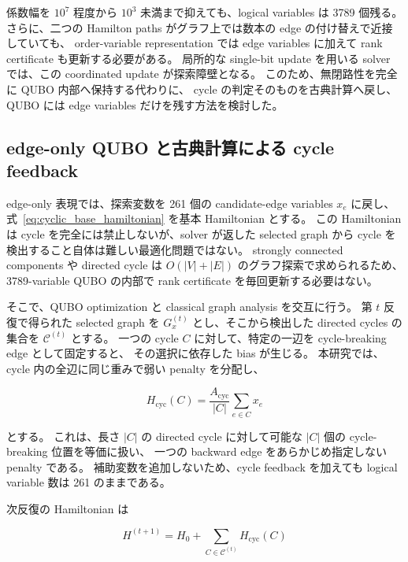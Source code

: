 係数幅を $10^7$ 程度から $10^3$ 未満まで抑えても、logical variables は 3789 個残る。
さらに、二つの Hamilton paths がグラフ上では数本の edge の付け替えで近接していても、
order-variable representation では edge variables に加えて rank certificate も更新する必要がある。
局所的な single-bit update を用いる solver では、この coordinated update が探索障壁となる。
このため、無閉路性を完全に QUBO 内部へ保持する代わりに、
cycle の判定そのものを古典計算へ戻し、QUBO には edge variables だけを残す方法を検討した。

\subsection{edge-only QUBO と古典計算による cycle feedback}

edge-only 表現では、探索変数を 261 個の candidate-edge variables $x_e$ に戻し、
式~\eqref{eq:cyclic_base_hamiltonian} を基本 Hamiltonian とする。
この Hamiltonian は cycle を完全には禁止しないが、solver が返した selected graph から
cycle を検出すること自体は難しい最適化問題ではない。
strongly connected components や directed cycle は $O(|V|+|E|)$ のグラフ探索で求められるため、
3789-variable QUBO の内部で rank certificate を毎回更新する必要はない。

そこで、QUBO optimization と classical graph analysis を交互に行う。
第 $t$ 反復で得られた selected graph を $G_x^{(t)}$ とし、そこから検出した directed cycles の集合を
$\mathcal{C}^{(t)}$ とする。
一つの cycle $C$ に対して、特定の一辺を cycle-breaking edge として固定すると、
その選択に依存した bias が生じる。
本研究では、cycle 内の全辺に同じ重みで弱い penalty を分配し、

\begin{equation}
H_{\mathrm{cyc}}(C)
=
\frac{A_{\mathrm{cyc}}}{|C|}
\sum_{e\in C}x_e
\label{eq:uniform_cycle_penalty}
\end{equation}

とする。
これは、長さ $|C|$ の directed cycle に対して可能な $|C|$ 個の cycle-breaking 位置を等価に扱い、
一つの backward edge をあらかじめ指定しない penalty である。
補助変数を追加しないため、cycle feedback を加えても logical variable 数は 261 のままである。

次反復の Hamiltonian は

\begin{equation}
H^{(t+1)}
=
H_0
+
\sum_{C\in\mathcal{C}^{(t)}}
H_{\mathrm{cyc}}(C)
\label{eq:iterative_cycle_hamiltonian}
\end{equation}

